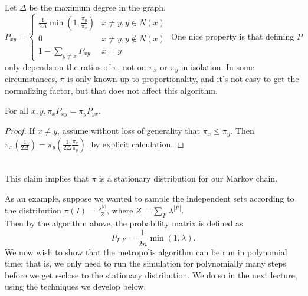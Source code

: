 Let $\Delta$ be the maximum degree in the graph. \\
$P_{xy} = \begin{cases}
\frac{1}{2\Delta}\min(1, \frac{\pi_y}{\pi_x}) & x \neq y, y \in N(x) \\
0 & x \neq y, y \notin N(x) \\
1 - \sum_{y\neq x} P_{xy} & x = y
\end{cases}$
One nice property is that defining $P$ only depends on the ratios of $\pi$, not on $\pi_x$ or $\pi_y$ in isolation. In some circumstances, $\pi$ is only known up to proportionality, and it's not easy to get the normalizing factor, but that does not affect this algorithm.
\begin{claim}
For all $x, y, \pi_x P_{xy} = \pi_y P_{yx}.$
  \end{claim}
\begin{proof}
If $x \neq y$, assume without loss of generality that $\pi_x \leq \pi_y$. Then $\pi_x(\frac{1}{2\Delta}) = \pi_y(\frac{1}{2\Delta}\frac{\pi_x}{\pi_y})$. by explicit calculation.
\end{proof} \\
This claim implies that $\pi$ is a stationary distribution for our Markov chain.
\bigskip

As an example, suppose we wanted to sample the independent sets according to the distribution $\pi(I) = \frac{\lambda^{|I|}}{Z}$, where $Z = \sum_{I'} \lambda^{|I'|}$. \\ 
Then by the algorithm above, the probability matrix is defined as
\[ P_{I, I'} = \frac{1}{2n}\min(1, \lambda).\]
We now wish to show that the metropolis algorithm can be run in polynomial time; that is, we only need to run the simulation for polynomially many steps before we get $\epsilon$-close to the stationary distribution. We do so in the next lecture, using the techniques we develop below.